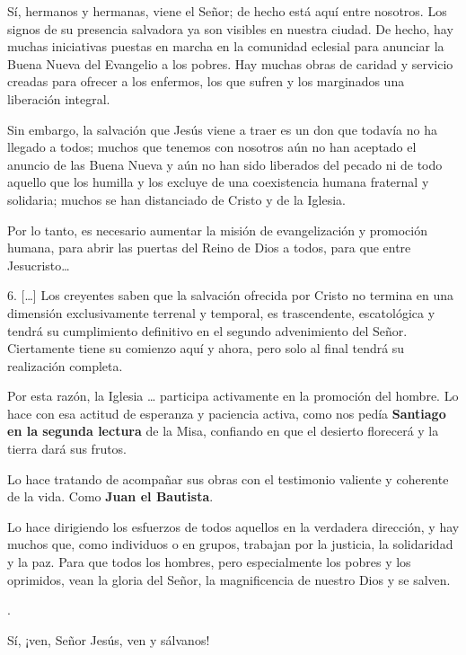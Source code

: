 \begin{body}
\begin{body}
Sí, hermanos y hermanas, viene el Señor; de hecho está aquí entre nosotros. Los signos de su presencia salvadora ya son visibles en nuestra ciudad. De hecho, hay muchas iniciativas puestas en marcha en la comunidad eclesial para anunciar la Buena Nueva del Evangelio a los pobres. Hay muchas obras de caridad y servicio creadas para ofrecer a los enfermos, los que sufren y los marginados una liberación integral.

Sin embargo, la salvación que Jesús viene a traer es un don que todavía no ha llegado a todos; muchos  que tenemos con nosotros aún no han aceptado el anuncio de las Buena Nueva y aún no han sido liberados del pecado ni de todo aquello que los humilla y los excluye de una coexistencia humana fraternal y solidaria; muchos  se han distanciado de Cristo y de la Iglesia.

Por lo tanto, es necesario aumentar la misión de evangelización y promoción humana, para abrir las puertas del Reino de Dios a todos, para que entre Jesucristo\ldots{}

6. {[}\ldots{}{]} Los creyentes saben que la salvación ofrecida por Cristo no termina en una dimensión exclusivamente terrenal y temporal, es trascendente, escatológica y tendrá su cumplimiento definitivo en el segundo advenimiento del Señor. Ciertamente tiene su comienzo aquí y ahora, pero solo al final tendrá su realización completa.

Por esta razón, la Iglesia \ldots{} participa activamente en la promoción del hombre. Lo hace con esa actitud de esperanza y paciencia activa, como nos pedía \textbf{Santiago en la segunda lectura} de la Misa, confiando en que el desierto florecerá y la tierra dará sus frutos.

Lo hace tratando de acompañar sus obras con el testimonio valiente y coherente de la vida. Como \textbf{Juan el Bautista}.

Lo hace dirigiendo los esfuerzos de todos aquellos en la verdadera dirección, y hay muchos que, como individuos o en grupos, trabajan por la justicia, la solidaridad y la paz. Para que todos los hombres, pero especialmente los pobres y los oprimidos, vean la gloria del Señor, la magnificencia de nuestro Dios y se salven.

.

Sí, ¡ven, Señor Jesús, ven y sálvanos!


\end{body}
\end{body}
